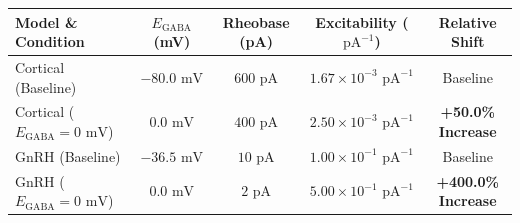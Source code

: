 \documentclass{article}
\begin{document}
\begin{table}[h!]
\centering
\begin{tabular}{|l|c|c|c|c|}
\hline
\textbf{Model \& Condition} & $E_{\text{GABA}}$ \textbf{(mV)} & \textbf{Rheobase (pA)} & \textbf{Excitability ($\text{pA}^{-1}$)} & \textbf{Relative Shift} \\ \hline
Cortical (Baseline) & $-80.0\text{ mV}$ & $600\text{ pA}$ & $1.67 \times 10^{-3}\text{ pA}^{-1}$ & Baseline \\ \hline
Cortical ($E_{\text{GABA}} = 0\text{ mV}$) & $0.0\text{ mV}$ & $400\text{ pA}$ & $2.50 \times 10^{-3}\text{ pA}^{-1}$ & \textbf{+50.0\% Increase} \\ \hline
GnRH (Baseline) & $-36.5\text{ mV}$ & $10\text{ pA}$ & $1.00 \times 10^{-1}\text{ pA}^{-1}$ & Baseline \\ \hline
GnRH ($E_{\text{GABA}} = 0\text{ mV}$) & $0.0\text{ mV}$ & $2\text{ pA}$ & $5.00 \times 10^{-1}\text{ pA}^{-1}$ & \textbf{+400.0\% Increase} \\ \hline
\end{tabular}
\end{table}
\end{document}
